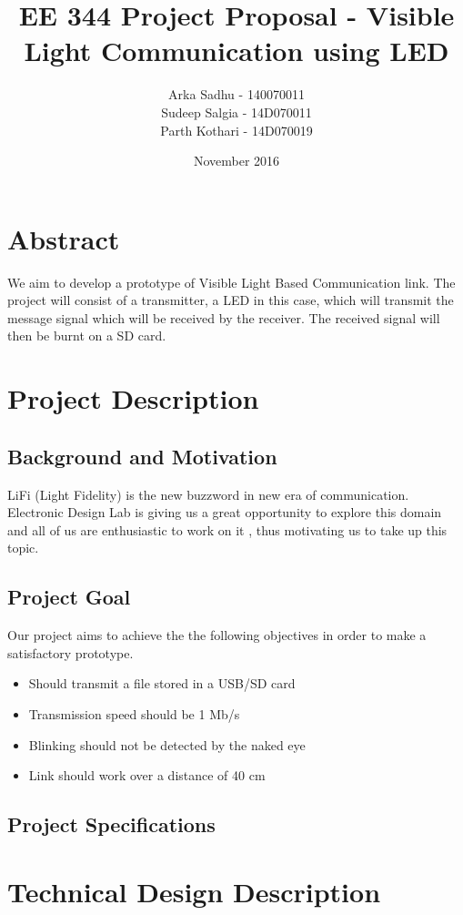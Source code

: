 \documentclass{article}
\title{EE 344 Project Proposal - Visible Light Communication using LED}
\author{
Arka Sadhu - 140070011\\
Sudeep Salgia - 14D070011\\
Parth Kothari - 14D070019\\
}
\date{November 2016}
\begin{document}
\maketitle

\tableofcontents
\section{Abstract}
We aim to develop a prototype of Visible Light Based Communication link. The project will consist of a transmitter, a LED in this case, which will transmit the message signal which will be received by the receiver. The received signal will then be burnt on a SD card.

\section{Project Description}

\subsection{Background and Motivation}
LiFi (Light Fidelity) is the new buzzword in new era of communication. Electronic Design Lab is giving us a great opportunity to explore this domain and  all of us are enthusiastic to work on it , thus motivating us to take up this topic.

\subsection{Project Goal}
Our project aims to achieve the the following objectives in order to make a satisfactory prototype.
\begin{itemize}
\item Should transmit a file stored in a USB/SD card
\item Transmission speed should be 1 Mb/s
\item Blinking should not be detected by the naked eye
\item Link should work over a distance of 40 cm
\end{itemize}
\subsection{Project Specifications}

\section{Technical Design Description}
\end{document}
